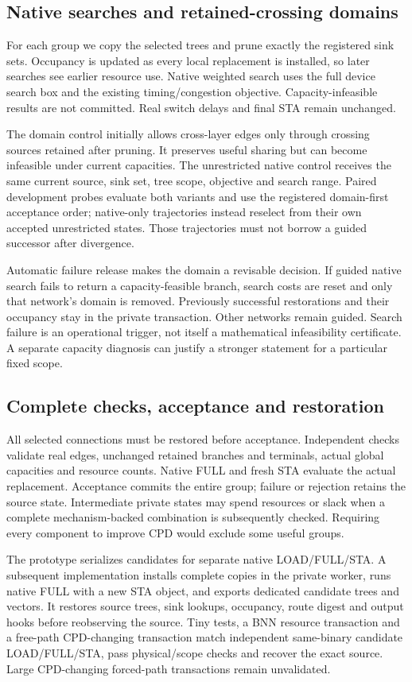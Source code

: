 \documentclass[conference,10pt]{IEEEtran}
\begin{document}
\subsection{Native searches and retained-crossing domains}
For each group we copy the selected trees and prune exactly the registered sink sets. Occupancy is updated as every local replacement is installed, so later searches see earlier resource use. Native weighted search uses the full device search box and the existing timing/congestion objective. Capacity-infeasible results are not committed. Real switch delays and final STA remain unchanged.

The domain control initially allows cross-layer edges only through crossing sources retained after pruning. It preserves useful sharing but can become infeasible under current capacities. The unrestricted native control receives the same current source, sink set, tree scope, objective and search range. Paired development probes evaluate both variants and use the registered domain-first acceptance order; native-only trajectories instead reselect from their own accepted unrestricted states. Those trajectories must not borrow a guided successor after divergence.

Automatic failure release makes the domain a revisable decision. If guided native search fails to return a capacity-feasible branch, search costs are reset and only that network's domain is removed. Previously successful restorations and their occupancy stay in the private transaction. Other networks remain guided. Search failure is an operational trigger, not itself a mathematical infeasibility certificate. A separate capacity diagnosis can justify a stronger statement for a particular fixed scope.

\subsection{Complete checks, acceptance and restoration}
All selected connections must be restored before acceptance. Independent checks validate real edges, unchanged retained branches and terminals, actual global capacities and resource counts. Native FULL and fresh STA evaluate the actual replacement. Acceptance commits the entire group; failure or rejection retains the source state. Intermediate private states may spend resources or slack when a complete mechanism-backed combination is subsequently checked. Requiring every component to improve CPD would exclude some useful groups.

The prototype serializes candidates for separate native LOAD/FULL/STA. A subsequent implementation installs complete copies in the private worker, runs native FULL with a new STA object, and exports dedicated candidate trees and vectors. It restores source trees, sink lookups, occupancy, route digest and output hooks before reobserving the source. Tiny tests, a BNN resource transaction and a free-path CPD-changing transaction match independent same-binary candidate LOAD/FULL/STA, pass physical/scope checks and recover the exact source. Large CPD-changing forced-path transactions remain unvalidated.
\end{document}
